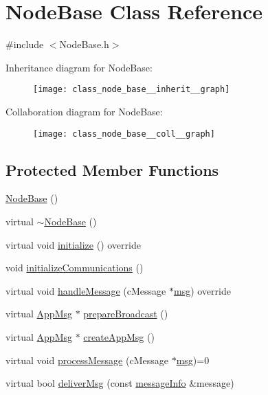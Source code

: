 \hypertarget{class_node_base}{}\section{Node\+Base Class Reference}
\label{class_node_base}


{\ttfamily \#include $<$Node\+Base.\+h$>$}



Inheritance diagram for Node\+Base\+:\nopagebreak
\begin{figure}[H]
\begin{center}
\leavevmode
\texttt{[image: class\_node\_base\_\_inherit\_\_graph]}
\end{center}
\end{figure}


Collaboration diagram for Node\+Base\+:\nopagebreak
\begin{figure}[H]
\begin{center}
\leavevmode
\texttt{[image: class\_node\_base\_\_coll\_\_graph]}
\end{center}
\end{figure}
\subsection*{Protected Member Functions}
\begin{DoxyCompactItemize}
\item 
\hyperlink{class_node_base_ab6ea4e77947d5b9b8da66d37dc432e7f}{Node\+Base} ()
\item 
virtual \hyperlink{class_node_base_a2fd7f7080282b6af95ba0b09fd30679d}{$\sim$\+Node\+Base} ()
\item 
virtual void \hyperlink{class_node_base_af7910c39553111295b66c88742d1198a}{initialize} () override
\item 
void \hyperlink{class_node_base_a2077b2a599f55050603268dbf8fff6a7}{initialize\+Communications} ()
\item 
virtual void \hyperlink{class_node_base_add2450264be5dd616f9f9ac94e83b988}{handle\+Message} (c\+Message $\ast$\hyperlink{_controller_8h_afa0f3b802fbc219228f7bb97996fa558}{msg}) override
\item 
virtual \hyperlink{class_app_msg}{App\+Msg} $\ast$ \hyperlink{class_node_base_a66c1dee9d15119bc3e68da71067ff6cd}{prepare\+Broadcast} ()
\item 
virtual \hyperlink{class_app_msg}{App\+Msg} $\ast$ \hyperlink{class_node_base_ac8b9e21b1cc32fd86aaa6c956b93a7c3}{create\+App\+Msg} ()
\item 
virtual void \hyperlink{class_node_base_ae70b168f2bc7407c249594b1c614301c}{process\+Message} (c\+Message $\ast$\hyperlink{_controller_8h_afa0f3b802fbc219228f7bb97996fa558}{msg})=0
\item 
virtual bool \hyperlink{class_node_base_a49052382add1123da26db6bfb687d254}{deliver\+Msg} (const \hyperlink{structures_8h_a7e7bdc1d2fff8a9436f2f352b2711ed6}{message\+Info} \&message)
\end{DoxyCompactItemize}
